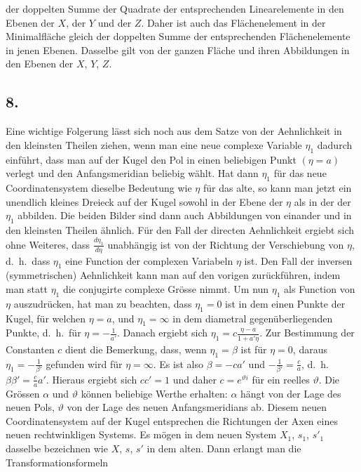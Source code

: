 \documentclass[12pt,a4paper]{article}
\begin{document}
\newpage
\noindent der doppelten Summe der Quadrate der entsprechenden Linearelemente in den Ebenen der $X$, der $Y$ und der $Z$. Daher ist auch das Fl\"achenelement in der Minimalfl\"ache gleich der doppelten Summe der entsprechenden Fl\"achenelemente in jenen Ebenen. Dasselbe gilt von der ganzen Fl\"ache und ihren Abbildungen in den Ebenen der $X$, $Y$, $Z$.

\subsection*{8.}

Eine wichtige Folgerung l\"asst sich noch aus dem Satze von der Aehnlichkeit in den kleinsten Theilen ziehen, wenn man eine neue complexe Variable $\eta_{1}$ dadurch einf\"uhrt, dass man auf der Kugel den Pol in einen beliebigen Punkt $(\eta = a)$ verlegt und den Anfangsmeridian beliebig w\"ahlt. Hat dann $\eta_{1}$ f\"ur das neue Coordinatensystem dieselbe Bedeutung wie $\eta$ f\"ur das alte, so kann man jetzt ein unendlich kleines Dreieck auf der Kugel sowohl in der Ebene der $\eta$ als in der der $\eta_{1}$ abbilden. Die beiden Bilder sind dann auch Abbildungen von einander und in den kleinsten Theilen \"ahnlich. F\"ur den Fall der directen Aehnlichkeit ergiebt sich ohne Weiteres, dass $\frac{d\eta_{1}}{d\eta}$ unabh\"angig ist von der Richtung der Verschiebung von $\eta$, d.\ h.\ dass $\eta_{1}$ eine Function der complexen Variabeln $\eta$ ist. Den Fall der inversen (symmetrischen) Aehnlichkeit kann man auf den vorigen zur\"uckf\"uhren, indem man statt $\eta_{1}$ die conjugirte complexe Gr\"osse nimmt. Um nun $\eta_{1}$ als Function von $\eta$ auszudr\"ucken, hat man zu beachten, dass $\eta_{1} = 0$ ist in dem einen Punkte der Kugel, f\"ur welchen $\eta = a$, und $\eta_{1} = \infty$ in dem diametral gegen\"uberliegenden Punkte, d.\ h.\ f\"ur $\eta = -\frac{1}{a'}$. Danach ergiebt sich $\eta_{1} = c\frac{\eta - a}{1 + a'\eta}$. Zur Bestimmung der Constanten $c$ dient die Bemerkung, dass, wenn $\eta_{1} = \beta$ ist f\"ur $\eta = 0$, daraus $\eta_{1} = -\frac{1}{\beta'}$ gefunden wird f\"ur $\eta = \infty$. Es ist also $\beta = -ca'$ und $-\frac{1}{\beta'} = \frac{c}{a}$, d.\ h.\ $\beta\beta' = \frac{c}{a}a'$. Hieraus ergiebt sich $cc' = 1$ und daher $c = e^{\vartheta i}$ f\"ur ein reelles $\vartheta$. Die Gr\"ossen $\alpha$ und $\vartheta$ k\"onnen beliebige Werthe erhalten: $\alpha$ h\"angt von der Lage des neuen Pols, $\vartheta$ von der Lage des neuen Anfangsmeridians ab. Diesem neuen Coordinatensystem auf der Kugel entsprechen die Richtungen der Axen eines neuen rechtwinkligen Systems. Es m\"ogen in dem neuen System $X_{1}$, $s_{1}$, $s'_{1}$ dasselbe bezeichnen wie $X$, $s$, $s'$ in dem alten. Dann erlangt man die Transformationsformeln
\end{document}
